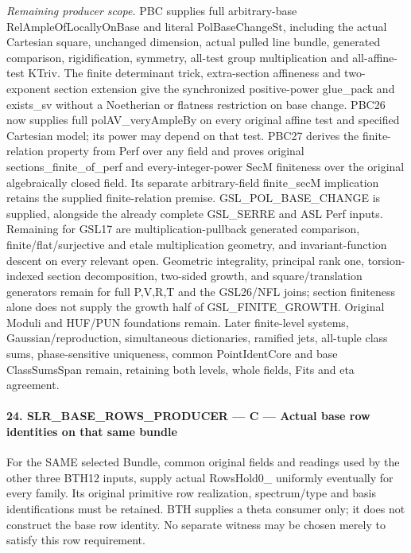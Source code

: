 \documentclass[11pt,a4paper]{article}
\numberwithin{equation}{section}
\theoremstyle{remark}\newtheorem{remark}[theorem]{Remark}
\begin{document}
\emph{Remaining producer scope.} PBC supplies full arbitrary-base RelAmpleOfLocallyOnBase and literal PolBaseChangeSt, including the actual Cartesian square, unchanged dimension, actual pulled line bundle, generated comparison, rigidification, symmetry, all-test group multiplication and all-affine-test KTriv. The finite determinant trick, extra-section affineness and two-exponent section extension give the synchronized positive-power glue\_\allowbreak pack and exists\_\allowbreak sv without a Noetherian or flatness restriction on base change. PBC26 now supplies full polAV\_\allowbreak veryAmpleBy on every original affine test and specified Cartesian model; its power may depend on that test. PBC27 derives the finite-relation property from Perf over any field and proves original sections\_\allowbreak finite\_\allowbreak of\_\allowbreak perf and every-integer-power SecM finiteness over the original algebraically closed field. Its separate arbitrary-field finite\_\allowbreak secM implication retains the supplied finite-relation premise. GSL\_\allowbreak POL\_\allowbreak BASE\_\allowbreak CHANGE is supplied, alongside the already complete GSL\_\allowbreak SERRE and ASL Perf inputs. Remaining for GSL17 are multiplication-pullback generated comparison, finite/flat/surjective and etale multiplication geometry, and invariant-function descent on every relevant open. Geometric integrality, principal rank one, torsion-indexed section decomposition, two-sided growth, and square/translation generators remain for full P,V,R,T and the GSL26/NFL joins; section finiteness alone does not supply the growth half of GSL\_\allowbreak FINITE\_\allowbreak GROWTH. Original Moduli and HUF/PUN foundations remain. Later finite-level systems, Gaussian/reproduction, simultaneous dictionaries, ramified jets, all-tuple class sums, phase-sensitive uniqueness, common PointIdentCore and base ClassSumsSpan remain, retaining both levels, whole fields, Fits and eta agreement.



\paragraph{24. SLR\_\allowbreak BASE\_\allowbreak ROWS\_\allowbreak PRODUCER — C — Actual base row identities on that same bundle}

For the SAME selected Bundle, common original fields and readings used by the other three BTH12 inputs, supply actual RowsHold0\_ uniformly eventually for every family. Its original primitive row realization, spectrum/type and basis identifications must be retained. BTH supplies a theta consumer only; it does not construct the base row identity. No separate witness may be chosen merely to satisfy this row requirement.
\end{document}
